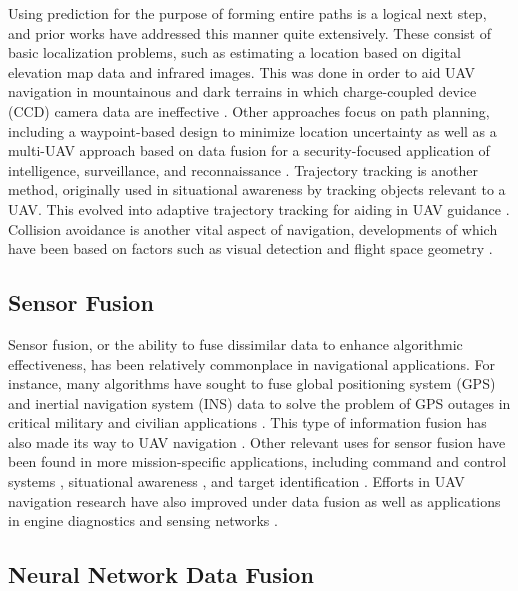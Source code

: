 \documentclass[12pt]{uthesis-v12}  %
\begin{document}
Using prediction for the purpose of forming entire paths is a logical next step, and prior works have addressed this manner quite extensively.
These consist of basic localization problems, such as estimating a location based on digital elevation map data and infrared images. 
This was done in order to aid UAV navigation in mountainous and dark terrains in which charge-coupled device (CCD) camera data are ineffective \cite{woo}.
Other approaches focus on path planning, including a waypoint-based design to minimize location uncertainty \cite{dogan} as well as a multi-UAV approach based on data fusion for a security-focused application of intelligence, surveillance, and reconnaissance \cite{shen}.
Trajectory tracking is another method, originally used in situational awareness \cite{cummings} by tracking objects relevant to a UAV. 
This evolved into adaptive trajectory tracking for aiding in UAV guidance \cite{wang6}.
Collision avoidance is another vital aspect of navigation, developments of which have been based on factors such as visual detection \cite{zsed} and flight space geometry \cite{wang5}.

\subsection{Sensor Fusion}
\label{sensor}

Sensor fusion, or the ability to fuse dissimilar data to enhance algorithmic effectiveness, has been relatively commonplace in navigational applications. 
For instance, many algorithms have sought to fuse global positioning system (GPS) and inertial navigation system (INS) data to solve the problem of GPS outages in critical military and civilian applications \cite{rhudy2, adus, bhatt, adus2, aggarwal, bhatt2}. 
This type of information fusion has also made its way to UAV navigation \cite{nemra, yoo}.
Other relevant uses for sensor fusion have been found in more mission-specific applications, including command and control systems \cite{verma}, situational awareness \cite{chen}, and target identification \cite{yu2}. 
Efforts in UAV navigation research have also improved under data fusion \cite{rhudy, shen} as well as applications in engine diagnostics \cite{basir, safiz} and sensing networks \cite{whyte}.

\subsection{Neural Network Data Fusion}
\label{ann-fusion}
\end{document}
